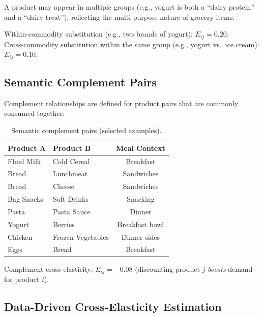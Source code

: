 \documentclass[11pt,a4paper]{article}
\begin{document}
A product may appear in multiple groups (e.g., yogurt is both a ``dairy protein'' and a ``dairy treat''), reflecting the multi-purpose nature of grocery items.

Within-commodity substitution (e.g., two brands of yogurt): $E_{ij} = 0.20$.\\
Cross-commodity substitution within the same group (e.g., yogurt vs.\ ice cream): $E_{ij} = 0.10$.

\subsection{Semantic Complement Pairs}

Complement relationships are defined for product pairs that are commonly consumed together:

\begin{table}[H]
\centering
\caption{Semantic complement pairs (selected examples).}
\begin{tabular}{@{}llc@{}}
\toprule
\textbf{Product A} & \textbf{Product B} & \textbf{Meal Context} \\
\midrule
Fluid Milk & Cold Cereal & Breakfast \\
Bread & Lunchmeat & Sandwiches \\
Bread & Cheese & Sandwiches \\
Bag Snacks & Soft Drinks & Snacking \\
Pasta & Pasta Sauce & Dinner \\
Yogurt & Berries & Breakfast bowl \\
Chicken & Frozen Vegetables & Dinner sides \\
Eggs & Bread & Breakfast \\
\bottomrule
\end{tabular}
\end{table}

Complement cross-elasticity: $E_{ij} = -0.08$ (discounting product $j$ \emph{boosts} demand for product $i$).

\subsection{Data-Driven Cross-Elasticity Estimation}
\end{document}
